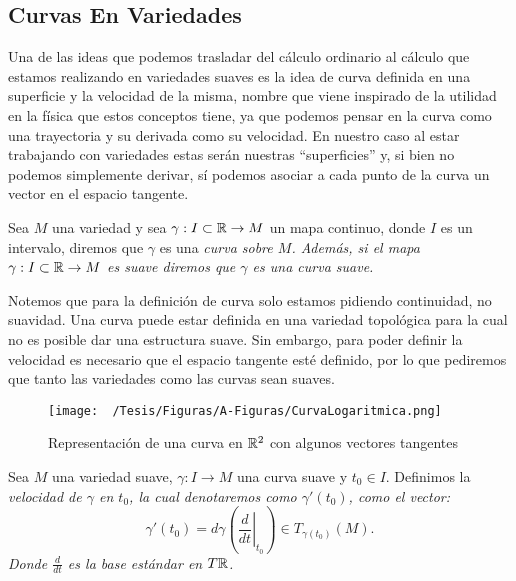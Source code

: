 \subsection{Curvas En Variedades}\label{Subsección: Curvas En Variedades}
Una de las ideas que podemos trasladar del cálculo ordinario al cálculo que estamos realizando en variedades suaves es la idea de curva definida en una superficie y la velocidad de la misma, nombre que viene inspirado de la utilidad en la física que estos conceptos tiene, ya que podemos pensar en la curva como una trayectoria y su derivada como su velocidad.
En nuestro caso al estar trabajando con variedades estas serán nuestras \enquote{superficies} y, si bien no podemos simplemente derivar, sí podemos asociar a cada punto de la curva un vector en el espacio tangente.

\begin{definition}
  \label{Definición: Curva en Variedades}
	Sea $M$ una variedad y sea $\gamma: I \subset \mathbb{R} \to M$ un mapa continuo, donde $I$ es un intervalo, diremos que $\gamma$ es una \it{curva sobre $M$}. Además, si el mapa $\gamma: I \subset \mathbb{R} \to M$ es suave diremos que $\gamma$ es una curva suave.
\end{definition}

Notemos que para la definición de curva solo estamos pidiendo continuidad, no suavidad. Una curva puede estar definida en una variedad topológica para la cual no es posible dar una estructura suave. Sin embargo, para poder definir la velocidad es necesario que el espacio tangente esté definido, por lo que pediremos que tanto las variedades como las curvas sean suaves.

\begin{figure}[h]
  \centering
  \texttt{[image: ~/Tesis/Figuras/A-Figuras/CurvaLogaritmica.png]}
  \caption{Representación de una curva en $\mathbb{R}^{2}$ con algunos vectores tangentes}
\end{figure}


\begin{definition}
	Sea $M$ una variedad suave, $\gamma: I \to M$ una curva suave y $t_0 \in I$. Definimos la \it{velocidad de $\gamma$ en $t_0$}, la cual denotaremos como $\gamma'(t_0)$, como el vector:
	\[
		\gamma'(t_0)
		=
		d\gamma\left( \left.  \frac{d}{dt}\right|_{t_0} \right)
		\in
		T_{\gamma(t_0)}(M).
	\]
	Donde $\frac{d}{dt}$ es la base estándar en $T\mathbb{R}$.
\end{definition}

